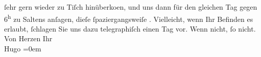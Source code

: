\begin{ledgroupsized}[t]{13cm}
               ſehr gern wieder zu Tiſch hinüberko{\geminationm}en, und uns dann für
               den gleichen Tag gegen 6\textsuperscript{h} zu Saltens anſagen, dieſe ſpaziergangsweiſe \label{K_L01411_2v}\label{K_L01411_2h}.\pend
           \pstart
           Vielleicht, wenn Ihr Befinden es erlaubt, ſchlagen Sie uns dazu telegraphiſch einen
               Tag vor. Wenn nicht, ſo nicht.\pend
           \pstart
           Von Herzen Ihr{\\[\baselineskip]}\spacefill\mbox{Hugo}\pend
           \leftskip=0em{}\endnumbering{}\end{ledgroupsized}  \newcommand{\dateiname}{L01411}\newcommand{\titel}{Hugo von Hofmannsthal an Arthur Schnitzler, 28. 6. 1904}\newcommand{\editorInnen}{Martin Anton Müller und Gerd-Hermann Susen}
            \footnotesize
\begin{ledgroupsized}[t]{11.5cm}
\end{ledgroupsized}
         
      